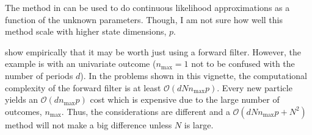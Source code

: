 \documentclass[notitlepage]{article}
\newcommand{\Lparen}[1]{\left( #1\right)}
\newcommand{\bigO}[1]{\mathcal{O}\Lparen{#1}}
\newcommand{\dimState}{p}
\newcommand{\nPart}{N}
\newcommand{\nPeriods}{d}
\newcommand{\nMax}{n_{\text{max}}}
\begin{document}
The method in \citet[see particularly section 6.2 on page 203]{malik11} can be used to do continuous likelihood approximations as a function of the unknown parameters. 
Though, I am not sure how well this method scale with higher state dimensions, $\dimState$.

\citet{kantas15} show empirically that it may be worth just using a forward filter. However, the example is with an univariate outcome ($\nMax = 1$ not to be confused with the number of periods $\nPeriods$). In the problems shown in this vignette, the computational complexity of 
the forward filter is at least $\bigO{\nPeriods\nPart\nMax\dimState}$. Every new particle 
yields an $\bigO{\nPeriods\nMax\dimState}$ cost which is expensive due to the large 
number of outcomes, $\nMax$. Thus, the considerations are different and 
a $\bigO{\nPeriods\nPart\nMax\dimState + \nPart^2}$ method will not make a big difference 
unless $\nPart$ is large.
\end{document}
